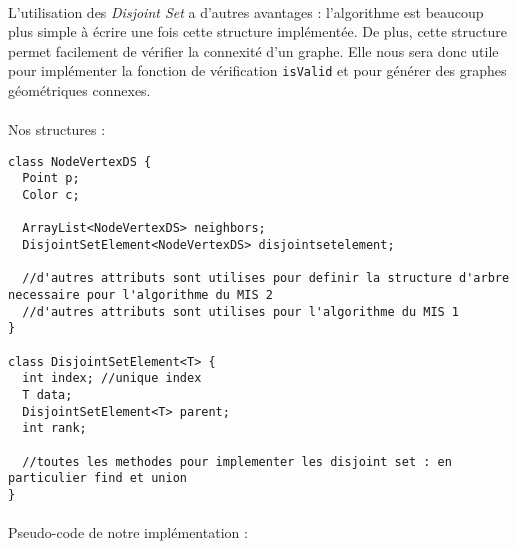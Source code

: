 \paragraph{}
L'utilisation des \textit{Disjoint Set} a d'autres avantages : l'algorithme est beaucoup plus simple à écrire une fois cette structure implémentée. De plus, cette structure permet facilement de vérifier la connexité d'un graphe. Elle nous sera donc utile pour implémenter la fonction de vérification \verb?isValid? et pour générer des graphes géométriques connexes.

\paragraph{}
Nos structures :
\begin{lstlisting}
class NodeVertexDS {
  Point p;
  Color c;
  
  ArrayList<NodeVertexDS> neighbors;
  DisjointSetElement<NodeVertexDS> disjointsetelement;
  
  //d'autres attributs sont utilises pour definir la structure d'arbre necessaire pour l'algorithme du MIS 2
  //d'autres attributs sont utilises pour l'algorithme du MIS 1
}

class DisjointSetElement<T> {
  int index; //unique index
  T data;
  DisjointSetElement<T> parent;
  int rank;
  
  //toutes les methodes pour implementer les disjoint set : en particulier find et union
}
\end{lstlisting}

\paragraph{}
Pseudo-code de notre implémentation :


